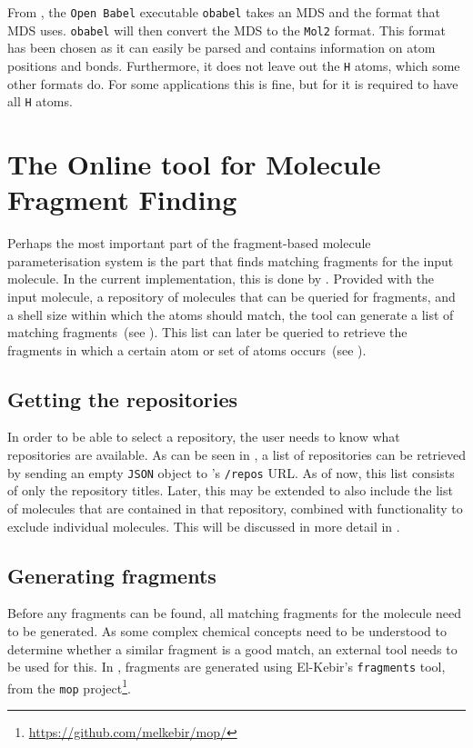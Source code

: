 From \oapoc, the \verb|Open Babel| executable \verb|obabel| takes an MDS and the format that MDS uses. \verb|obabel| will then convert the MDS to the \verb|Mol2| format. This format has been chosen as it can easily be parsed and contains information on atom positions and bonds. Furthermore, it does not leave out the \verb|H| atoms, which some other formats do. For some applications this is fine, but for \oframp{} it is required to have all \verb|H| atoms.


\section[\omfraf]{The Online tool for Molecule Fragment Finding}
Perhaps the most important part of the fragment-based molecule parameterisation system is the part that finds matching fragments for the input molecule. In the current implementation, this is done by \omfraf. Provided with the input molecule, a repository of molecules that can be queried for fragments, and a shell size within which the atoms should match, the tool can generate a list of matching fragments~(see ). This list can later be queried to retrieve the fragments in which a certain atom or set of atoms occurs~(see ).

\subsection{Getting the repositories}
In order to be able to select a repository, the user needs to know what repositories are available. As can be seen in , a list of repositories can be retrieved by sending an empty \verb|JSON| object to \omfraf's \verb|/repos| URL. As of now, this list consists of only the repository titles. Later, this may be extended to also include the list of molecules that are contained in that repository, combined with functionality to exclude individual molecules. This will be discussed in more detail in .

\subsection{Generating fragments}
Before any fragments can be found, all matching fragments for the molecule need to be generated. As some complex chemical concepts need to be understood to determine whether a similar fragment is a good match, an external tool needs to be used for this. In \omfraf, fragments are generated using El-Kebir's \verb|fragments| tool, from the \verb|mop| project\footnote{\url{https://github.com/melkebir/mop/}}.

